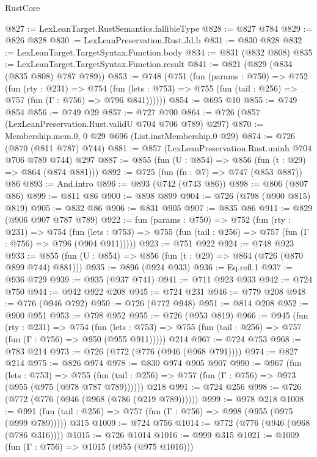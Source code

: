 \begin{lexlean}{RustCore}
\begin{coremodule}
@827 := LexLeanTarget.RustSemantics.fallibleType
@828 := @827 @784
@829 := @826 @828
@830 := LexLeanPreservation.Rust.Jd.b
@831 := @830 @828
@832 := LexLeanTarget.TargetSyntax.Function.body
@834 := @831 (@832 @808)
@835 := LexLeanTarget.TargetSyntax.Function.result
@841 := @821 (@829 (@834 (@835 @808) @787 @789))
@853 := @748
    (@751
      (fun (params : @750) =>
      @752
        (fun (rty : @231) =>
        @754
          (fun (lets : @753) => @755 (fun (tail : @256) => @757 (fun (Γ : @756) => @796 @841))))))
@854 := @695 @10
@855 := @749 @854
@856 := @749 @29
@857 := @727 @700
@864 := @726 (@857 (LexLeanPreservation.Rust.validU @704 @706 @789) @297)
@870 := Membership.mem.{0, 0} @29 @696 (List.instMembership.{0} @29)
@874 := @726 (@870 (@811 @787) @744)
@881 := @857 (LexLeanPreservation.Rust.uninh @704 @706 @789 @744) @297
@887 := @855 (fun (U : @854) => @856 (fun (t : @29) => @864 (@874 @881)))
@892 := @725 (fun (fn : @7) => @747 (@853 @887)) @86
@893 := And.intro
@896 := @893 (@742 (@743 @86))
@898 := @806 (@807 @86)
@899 := @811 @86
@900 := @898 @899
@904 := @726 (@798 (@900 @815) @819)
@905 := @832 @86
@906 := @831 @905
@907 := @835 @86
@911 := @829 (@906 @907 @787 @789)
@922 := fun (params : @750) =>
  @752
    (fun (rty : @231) =>
    @754
      (fun (lets : @753) => @755 (fun (tail : @256) => @757 (fun (Γ : @756) => @796 (@904 @911)))))
@923 := @751 @922
@924 := @748 @923
@933 := @855 (fun (U : @854) => @856 (fun (t : @29) => @864 (@726 (@870 @899 @744) @881)))
@935 := @896 (@924 @933)
@936 := Eq.refl.{1}
@937 := @936 @729
@939 := @935 (@937 @741)
@941 := @711 @923 @933
@942 := @724 @750
@944 := @942 @922 @208
@945 := @724 @231
@946 := @779 @208
@948 := @776 (@946 @792)
@950 := @726 (@772 @948)
@951 := @814 @208
@952 := @900 @951
@953 := @798 @952
@955 := @726 (@953 @819)
@966 := @945
    (fun (rty : @231) =>
    @754
      (fun (lets : @753) => @755 (fun (tail : @256) => @757 (fun (Γ : @756) => @950 (@955 @911)))))
    @214
@967 := @724 @753
@968 := @783 @214
@973 := @726 (@772 (@776 (@946 (@968 @791))))
@974 := @827 @214
@975 := @826 @974
@978 := @830 @974 @905 @907
@990 := @967
    (fun (lets : @753) =>
    @755 (fun (tail : @256) => @757 (fun (Γ : @756) => @973 (@955 (@975 (@978 @787 @789))))))
    @218
@991 := @724 @256
@998 := @726 (@772 (@776 (@946 (@968 (@786 (@219 @789))))))
@999 := @978 @218
@1008 := @991 (fun (tail : @256) => @757 (fun (Γ : @756) => @998 (@955 (@975 (@999 @789))))) @315
@1009 := @724 @756
@1014 := @772 (@776 (@946 (@968 (@786 @316))))
@1015 := @726 @1014
@1016 := @999 @315
@1021 := @1009 (fun (Γ : @756) => @1015 (@955 (@975 @1016)))

\end{coremodule}
\end{lexlean}
